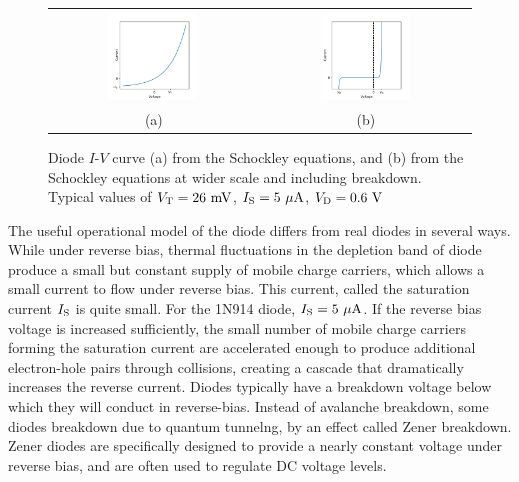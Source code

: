 \documentclass[12pt,oneside]{book}
\begin{document}
\begin{figure}[htbp]
\begin{center}
\begin{tabular}{cc}
\includegraphics[width=0.45\textwidth]{figs/diodeeq.pdf} &
\includegraphics[width=0.45\textwidth]{figs/breakdown.pdf} \\
(a) &
(b) \\
\end{tabular}
\caption{Diode $I$-$V$ curve (a) from the Schockley equations, and (b) from the Schockley equations at wider scale and including breakdown.  Typical values of $V_{\rm T} = 26~\rm mV$, $I_{\rm S} = 5~\rm \mu A$, $V_{\rm D}=0.6~\rm V$}
\label{fig:diodeeqs}
\end{center}
\end{figure}

The useful operational model of the diode differs from real diodes in several ways.  While under reverse bias, thermal fluctuations in the depletion band of diode produce a small but constant supply of mobile charge carriers, which allows a small current to flow under reverse bias.  This current, called the saturation current $I_{\rm S}$ is quite small.  For the 1N914 diode, $I_{\rm S} = 5~\rm \mu A$.
If the reverse bias voltage is increased sufficiently, the small number of mobile charge carriers forming the saturation current are accelerated enough to produce additional electron-hole pairs through collisions, creating a cascade that dramatically increases the reverse current.   Diodes typically have a breakdown voltage below which they will conduct in reverse-bias.  Instead of avalanche breakdown, some diodes breakdown due to quantum tunnelng, by an effect called Zener breakdown.  Zener diodes are specifically designed to provide a nearly constant voltage under reverse bias, and are often used to regulate DC voltage levels.
\end{document}
